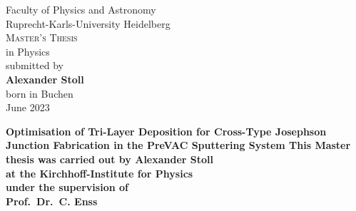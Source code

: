 \begin{titlepage}
	
	\thispagestyle{empty}
	\linespread{1.6}     %
	\large
	\begin{center}
		{\Huge Faculty of Physics and Astronomy}\\
		{\LARGE Ruprecht-Karls-University Heidelberg}\\
		\vspace{2cm}
		\vfill
		\linespread{1.3}
		\textsc{Master's Thesis}\\ 
		\vspace{-0.2cm}
		in Physics \\
		\bigskip
		submitted by\\
		\vspace{-0.2cm}
		\textbf{Alexander Stoll}\\
		\vspace{-0.2cm}
		born in Buchen\\
		\bigskip
		June 2023
	\end{center}
\end{titlepage}


\begin{titlepage}
	\thispagestyle{empty}
	\linespread{1.3}     %
	\begin{center}
		\bf
		\Large
		Optimisation of Tri-Layer Deposition for Cross-Type Josephson Junction Fabrication in the PreVAC Sputtering System
		\rm	
		\large
		\vfill
		This Master thesis was carried out by Alexander Stoll \\
		at the Kirchhoff-Institute for Physics\\
		under the supervision of\\
		\textbf{Prof.\ Dr.\ C. Enss}
	\end{center}
\end{titlepage}



